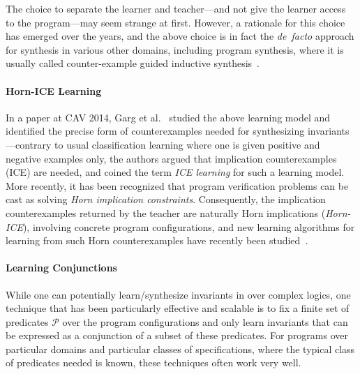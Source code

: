 The choice to separate the learner and teacher---and not give the learner access to the program---may seem strange at first.
However, a rationale for this choice has emerged over the years, and the above choice is in fact the \textit{de~facto} approach for synthesis in various other domains, including program synthesis, where it is usually called counter-example guided inductive synthesis~\cite{DBLP:series/natosec/AlurBDF0JKMMRSSSSTU15,cegis,DBLP:conf/asplos/Solar-LezamaTBSS06}.


\paragraph{\bfseries Horn-ICE Learning}
In a paper at CAV 2014, Garg et al.~\cite{DBLP:conf/cav/0001LMN14} studied the above learning model and identified the precise form of counterexamples needed for synthesizing invariants---contrary to usual classification learning where one is given positive and negative examples only, the authors argued that implication counterexamples (ICE) are needed, and coined the term \emph{ICE learning} for such a learning model.
More recently, it has been recognized that program verification problems can be cast as solving \emph{Horn implication constraints}.
Consequently, the implication counterexamples returned by the teacher are naturally Horn implications (\emph{Horn-ICE}), involving concrete program configurations, and new learning algorithms for learning from such Horn counterexamples have recently been studied~\cite{DBLP:conf/tacas/ChampionC0S18,DBLP:journals/pacmpl/EzudheenND0M18}.
 
\paragraph{\bfseries Learning Conjunctions}
While one can potentially learn/synthesize invariants in over complex logics, one technique that has been particularly effective and scalable is to fix a finite set of predicates $\mathcal P$ over the program configurations and only learn invariants that can be expressed as a conjunction of a subset of these predicates.
For programs over particular domains and particular classes of specifications, where the typical class of predicates needed is known, these techniques often work very well. 

